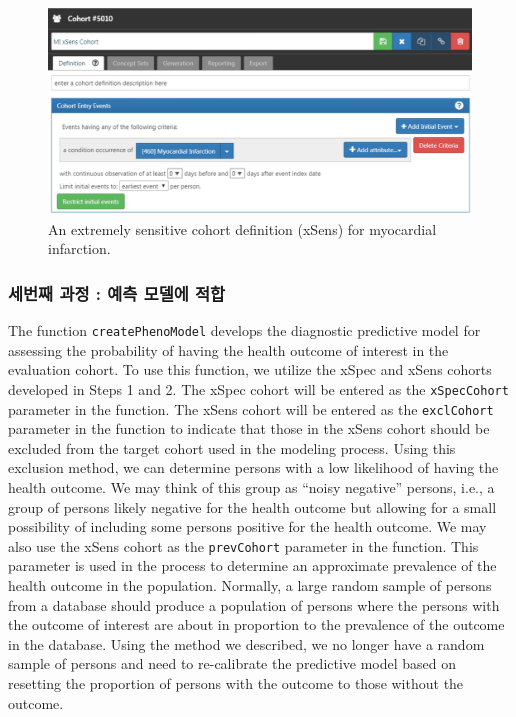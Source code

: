 \documentclass[11pt]{book}
\theoremstyle{definition}
\theoremstyle{definition}
\theoremstyle{definition}
\theoremstyle{remark}
\begin{document}
\begin{figure}

{\centering \includegraphics[width=1\linewidth]{images/ClinicalValidity/xSens} 

}

\caption{An extremely sensitive cohort definition (xSens) for myocardial infarction.}\label{fig:xSens}
\end{figure}

\subsubsection*{세번째 과정 : 예측 모델에 적합}\label{----}

The function \texttt{createPhenoModel} develops the diagnostic
predictive model for assessing the probability of having the health
outcome of interest in the evaluation cohort. To use this function, we
utilize the xSpec and xSens cohorts developed in Steps 1 and 2. The
xSpec cohort will be entered as the \texttt{xSpecCohort} parameter in
the function. The xSens cohort will be entered as the
\texttt{exclCohort} parameter in the function to indicate that those in
the xSens cohort should be excluded from the target cohort used in the
modeling process. Using this exclusion method, we can determine persons
with a low likelihood of having the health outcome. We may think of this
group as ``noisy negative'' persons, i.e., a group of persons likely
negative for the health outcome but allowing for a small possibility of
including some persons positive for the health outcome. We may also use
the xSens cohort as the \texttt{prevCohort} parameter in the function.
This parameter is used in the process to determine an approximate
prevalence of the health outcome in the population. Normally, a large
random sample of persons from a database should produce a population of
persons where the persons with the outcome of interest are about in
proportion to the prevalence of the outcome in the database. Using the
method we described, we no longer have a random sample of persons and
need to re-calibrate the predictive model based on resetting the
proportion of persons with the outcome to those without the outcome.
\end{document}
